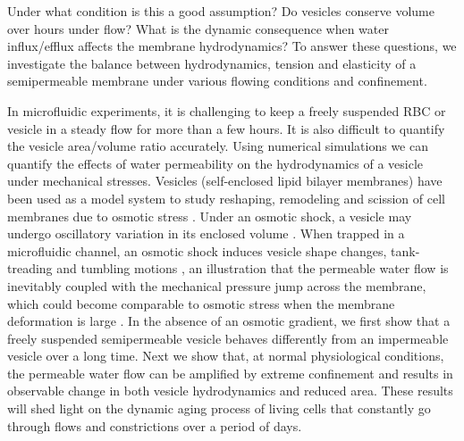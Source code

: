 \documentclass[9pt,twocolumn,twoside,lineno]{pnas-new}
\begin{document}
Under what condition is this a good assumption? Do vesicles conserve volume over hours under flow? What is the dynamic consequence when water influx/efflux affects the membrane hydrodynamics?
To answer these questions, we investigate the balance between hydrodynamics, tension and elasticity of a semipermeable membrane under various flowing conditions and confinement. 



In microfluidic experiments, it is challenging to keep a freely suspended RBC or vesicle in a steady flow for more than a few hours. It is also difficult to quantify the vesicle area/volume ratio accurately. Using numerical simulations we can quantify  the effects of water permeability on the hydrodynamics of a vesicle under mechanical stresses. 
Vesicles (self-enclosed lipid bilayer membranes) have been used as a model system to study reshaping, remodeling and scission of cell membranes due to osmotic stress \cite{OgleckaEtAl2014_eLife,CamposSaric2020_bioRxiv,Dimova2020_GVB,BhatiaChrist2020_SoftMatt}. Under an osmotic shock, a vesicle may undergo oscillatory variation in its enclosed volume \cite{ChabanonHoLiedberg2017_BJ}. When trapped in a microfluidic channel, an osmotic shock induces 
 vesicle shape changes, tank-treading and tumbling motions \cite{BhatiaRobinsonDimova2020_SoftMatt,BhatiaChrist2020_SoftMatt}, an illustration that the permeable water flow is inevitably coupled with the mechanical pressure jump across the membrane\cite{yao-mor2017}, which could become comparable to osmotic stress when the membrane deformation is large \cite{LiMoriSun2015_PRL,yao-mor2017}.  In the absence of an osmotic gradient, we first show that a freely suspended semipermeable vesicle behaves differently from an impermeable vesicle over a long time. Next we show that, at normal physiological conditions, the permeable water flow can be amplified by extreme confinement and results in observable change in both vesicle hydrodynamics and reduced area.  These results will shed light on the dynamic aging process of living cells that constantly go through flows and constrictions over a period of days.
 
\end{document}
